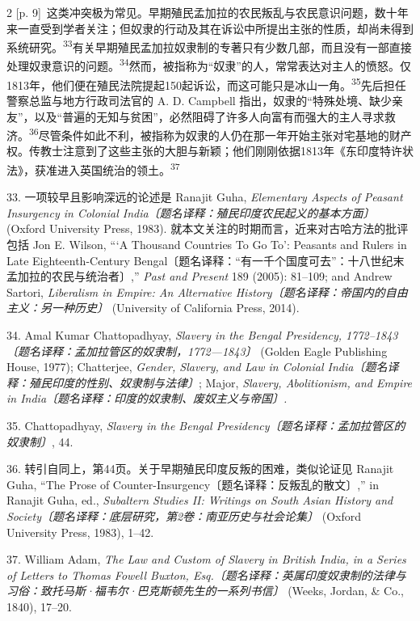 \documentclass[10pt,a4paper]{article}
\begin{document}
\begin{paracol}{2}
{\scriptsize\color{gray} [p. 9]}\ 这类冲突极为常见。早期殖民孟加拉的农民叛乱与农民意识问题，数十年来一直受到学者关注；但奴隶的行动及其在诉讼中所提出主张的性质，却尚未得到系统研\mbox{究。\textsuperscript{33}}有关早期殖民孟加拉奴隶制的专著只有少数几部，而且没有一部直接处理奴隶意识的问\mbox{题。\textsuperscript{34}}然而，被指称为“奴隶”的人，常常表达对主人的愤怒。仅1813年，他们便在殖民法院提起150起诉讼，而这可能只是冰山一\mbox{角。\textsuperscript{35}}先后担任警察总监与地方行政司法官的 A. D. Campbell 指出，奴隶的“特殊处境、缺少亲友”，以及“普遍的无知与贫困”，必然阻碍了许多人向富有而强大的主人寻求救\mbox{济。\textsuperscript{36}}尽管条件如此不利，被指称为奴隶的人仍在那一年开始主张对宅基地的财产权。传教士注意到了这些主张的大胆与新颖；他们刚刚依据1813年《东印度特许状法》，获准进入英国统治的领\mbox{土。\textsuperscript{37}}\par{\small 33. 一项较早且影响深远的论述是 Ranajit Guha, \textit{Elementary Aspects of Peasant Insurgency in Colonial India〔题名译释：殖民印度农民起义的基本方面〕} (Oxford University Press, 1983). 就本文关注的时期而言，近来对古哈方法的批评包括 Jon E. Wilson, “‘A Thousand Countries To Go To’: Peasants and Rulers in Late Eighteenth-Century Bengal〔题名译释：“有一千个国度可去”：十八世纪末孟加拉的农民与统治者〕,” \textit{Past and Present} 189 (2005): 81–109; and Andrew Sartori, \textit{Liberalism in Empire: An Alternative History〔题名译释：帝国内的自由主义：另一种历史〕} (University of California Press, 2014).\par}{\small 34. Amal Kumar Chattopadhyay, \textit{Slavery in the Bengal Presidency, 1772–1843〔题名译释：孟加拉管区的奴隶制，1772—1843〕} (Golden Eagle Publishing House, 1977); Chatterjee, \textit{Gender, Slavery, and Law in Colonial India〔题名译释：殖民印度的性别、奴隶制与法律〕}; Major, \textit{Slavery, Abolitionism, and Empire in India〔题名译释：印度的奴隶制、废奴主义与帝国〕.}\par}{\small 35. Chattopadhyay, \textit{Slavery in the Bengal Presidency〔题名译释：孟加拉管区的奴隶制〕}, 44.\par}{\small 36. 转引自同上，第44页。关于早期殖民印度反叛的困难，类似论证见 Ranajit Guha, “The Prose of Counter-Insurgency〔题名译释：反叛乱的散文〕,” in Ranajit Guha, ed., \textit{Subaltern Studies II: Writings on South Asian History and Society〔题名译释：底层研究，第2卷：南亚历史与社会论集〕} (Oxford University Press, 1983), 1–42.\par}{\small 37. William Adam, \textit{The Law and Custom of Slavery in British India, in a Series of Letters to Thomas Fowell Buxton, Esq.〔题名译释：英属印度奴隶制的法律与习俗：致托马斯·福韦尔·巴克斯顿先生的一系列书信〕} (Weeks, Jordan, \& Co., 1840), 17–20.\par}

\end{paracol}
\end{document}

